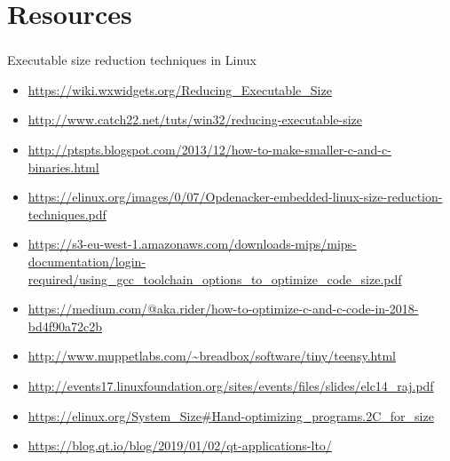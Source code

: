\documentclass{beamer}
\begin{document}
\section{Resources}
\begin{frame}
\frametitle{\secname}
\tiny

Executable size reduction techniques in Linux

\begin{itemize}
\item \url{https://wiki.wxwidgets.org/Reducing_Executable_Size}
\item \url{http://www.catch22.net/tuts/win32/reducing-executable-size}
\item \url{http://ptspts.blogspot.com/2013/12/how-to-make-smaller-c-and-c-binaries.html}
\item \url{https://elinux.org/images/0/07/Opdenacker-embedded-linux-size-reduction-techniques.pdf}
\item \url{https://s3-eu-west-1.amazonaws.com/downloads-mips/mips-documentation/login-required/using_gcc_toolchain_options_to_optimize_code_size.pdf}
\item \url{https://medium.com/@aka.rider/how-to-optimize-c-and-c-code-in-2018-bd4f90a72c2b}
\item \url{http://www.muppetlabs.com/~breadbox/software/tiny/teensy.html}
\item \url{http://events17.linuxfoundation.org/sites/events/files/slides/elc14_raj.pdf}
\item \url{https://elinux.org/System_Size\#Hand-optimizing_programs.2C_for_size}
\item \url{https://blog.qt.io/blog/2019/01/02/qt-applications-lto/}
\end{itemize}
\end{frame}
\end{document}

